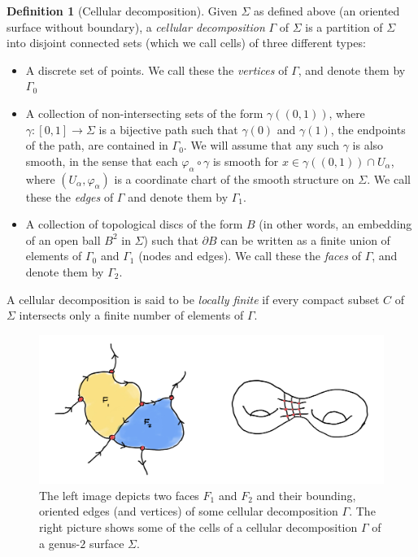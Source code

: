 \documentclass[aps,pra,showpacs,notitlepage,onecolumn,superscriptaddress,nofootinbib]{revtex4-1}
\theoremstyle{definition}
\newtheorem{definition}{Definition}[section]
\begin{document}
\begin{definition}[Cellular decomposition]
  Given $\Sigma$ as defined above (an oriented surface without boundary), a \emph{cellular decomposition} $\Gamma$ of $\Sigma$ is a partition of $\Sigma$ into disjoint connected
  sets (which we call cells) of three different types:
  \begin{itemize}
  \item A discrete set of points. We call these the \emph{vertices} of $\Gamma$, and denote them by $\Gamma_0$
  \item A collection of non-intersecting sets of the form $\gamma((0, 1))$, where $\gamma : [0, 1] \rightarrow \Sigma$ is a bijective path such that $\gamma(0)$ and $\gamma(1)$, the endpoints of the path, are contained
    in $\Gamma_0$. We will assume that any such $\gamma$ is also smooth, in the sense that each $\varphi_{\alpha} \circ \gamma$ is smooth for $x \in \gamma((0, 1)) \cap U_{\alpha}$, where $(U_{\alpha}, \varphi_{\alpha})$ is a coordinate chart
    of the smooth structure on $\Sigma$. We call these the \emph{edges} of $\Gamma$ and denote them by $\Gamma_1$.
  \item A collection of topological discs of the form $B$ (in other words, an embedding of an open ball $B^2$ in $\Sigma$)
    such that $\partial B$ can be written as a finite union of elements of $\Gamma_0$ and $\Gamma_1$ (nodes and edges). We call these the \emph{faces} of $\Gamma$, and denote them by $\Gamma_2$.
  \end{itemize}
  A cellular decomposition is said to be \emph{locally finite} if every compact subset $C$ of $\Sigma$ intersects only a finite number of elements of $\Gamma$.
\end{definition}

\begin{center}
  \begin{figure}
    \includegraphics[width=400pt]{./assets/mercat1.jpeg}
    \caption{The left image depicts two faces $F_1$ and $F_2$ and their bounding, oriented edges (and vertices) of some cellular decomposition $\Gamma$. The right picture shows
    some of the cells of a cellular decomposition $\Gamma$ of a genus-$2$ surface $\Sigma$.}
    \end{figure}
  \end{center}
\end{document}
